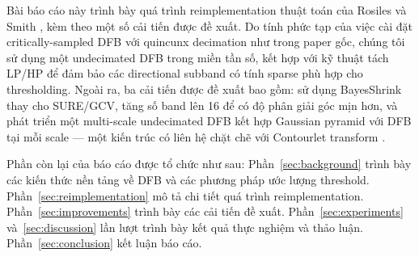 Bài báo cáo này trình bày quá trình reimplementation thuật toán của Rosiles và Smith \cite{rosiles2000}, kèm theo một số cải tiến được đề xuất. Do tính phức tạp của việc cài đặt critically-sampled DFB với quincunx decimation như trong paper gốc, chúng tôi sử dụng một undecimated DFB trong miền tần số, kết hợp với kỹ thuật tách LP/HP để đảm bảo các directional subband có tính sparse phù hợp cho thresholding. Ngoài ra, ba cải tiến được đề xuất bao gồm: sử dụng BayesShrink thay cho SURE/GCV, tăng số band lên 16 để có độ phân giải góc mịn hơn, và phát triển một multi-scale undecimated DFB kết hợp Gaussian pyramid với DFB tại mỗi scale --- một kiến trúc có liên hệ chặt chẽ với Contourlet transform \cite{do2005}.

Phần còn lại của báo cáo được tổ chức như sau: Phần~\ref{sec:background} trình bày các kiến thức nền tảng về DFB và các phương pháp ước lượng threshold. Phần~\ref{sec:reimplementation} mô tả chi tiết quá trình reimplementation. Phần~\ref{sec:improvements} trình bày các cải tiến đề xuất. Phần~\ref{sec:experiments} và~\ref{sec:discussion} lần lượt trình bày kết quả thực nghiệm và thảo luận. Phần~\ref{sec:conclusion} kết luận báo cáo.
